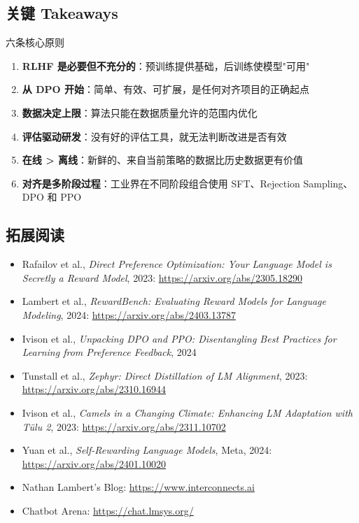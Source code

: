 \subsection{关键 Takeaways}

\begin{importantbox}{六条核心原则}
\begin{enumerate}
    \item \textbf{RLHF 是必要但不充分的}：预训练提供基础，后训练使模型"可用"
    \item \textbf{从 DPO 开始}：简单、有效、可扩展，是任何对齐项目的正确起点
    \item \textbf{数据决定上限}：算法只能在数据质量允许的范围内优化
    \item \textbf{评估驱动研发}：没有好的评估工具，就无法判断改进是否有效
    \item \textbf{在线 > 离线}：新鲜的、来自当前策略的数据比历史数据更有价值
    \item \textbf{对齐是多阶段过程}：工业界在不同阶段组合使用 SFT、Rejection Sampling、DPO 和 PPO
\end{enumerate}
\end{importantbox}

\subsection{拓展阅读}

\begin{itemize}
    \item Rafailov et al., \textit{Direct Preference Optimization: Your Language Model is Secretly a Reward Model}, 2023: \url{https://arxiv.org/abs/2305.18290}
    \item Lambert et al., \textit{RewardBench: Evaluating Reward Models for Language Modeling}, 2024: \url{https://arxiv.org/abs/2403.13787}
    \item Ivison et al., \textit{Unpacking DPO and PPO: Disentangling Best Practices for Learning from Preference Feedback}, 2024
    \item Tunstall et al., \textit{Zephyr: Direct Distillation of LM Alignment}, 2023: \url{https://arxiv.org/abs/2310.16944}
    \item Ivison et al., \textit{Camels in a Changing Climate: Enhancing LM Adaptation with T\"ulu 2}, 2023: \url{https://arxiv.org/abs/2311.10702}
    \item Yuan et al., \textit{Self-Rewarding Language Models}, Meta, 2024: \url{https://arxiv.org/abs/2401.10020}
    \item Nathan Lambert's Blog: \url{https://www.interconnects.ai}
    \item Chatbot Arena: \url{https://chat.lmsys.org/}
\end{itemize}



